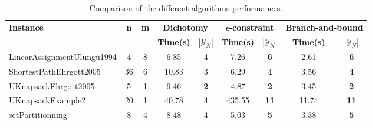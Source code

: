 \begin{table}[!h]
\centering
\hspace*{-1cm}\begin{tabular}{lcccccccc}
\toprule
\textbf{Instance} & \textbf{n} & \textbf{m} & \multicolumn{2}{c}{\textbf{Dichotomy}} & \multicolumn{2}{c}{\textbf{$\mathbf{\epsilon}$-constraint}}  & \multicolumn{2}{c}{\textbf{Branch-and-bound}}
\\
\cmidrule(r){4-5} \cmidrule(r){6-7} \cmidrule(r){8-9}
~ & ~ & ~ & \textbf{Time(s)} & \textbf{$|\mathcal{Y}_N|$} & \textbf{Time(s)} & \textbf{$|\mathcal{Y}_N|$} & \textbf{Time(s)} & \textbf{$|\mathcal{Y}_N|$} \\
\midrule

LinearAssignmentUlungu1994 & 4 & 8 & 6.85 & 4 & 7.26 &  \textbf{6} &  \textcolor{blue2}{2.61} &  \textbf{6} \\
ShortestPathEhrgott2005 & 36 & 6 & 10.83 & 3 & 6.29 &  \textbf{4} &  \textcolor{blue2}{3.56} &  \textbf{4} \\
UKnapsackEhrgott2005 & 5 & 1 & 9.46 &  \textbf{2} & 4.87 &  \textbf{2} &  \textcolor{blue2}{3.45} &  \textbf{2} \\
UKnapsackExample2 & 20 & 1 & 40.78 & 4 & 435.55 &  \textbf{11} &  \textcolor{blue2}{11.74} &  \textbf{11} \\
setPartitionning & 8 & 4 & 8.48 & 4 & 5.03 &  \textbf{5} &  \textcolor{blue2}{3.38} &  \textbf{5} \\
\bottomrule
\end{tabular}
\caption{Comparison of the different algorithms performances.}
\label{tab:table_compare}
\end{table}

